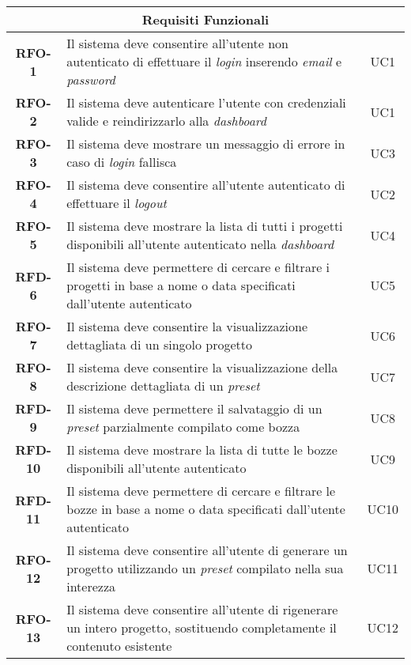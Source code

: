 \begin{longtable}{|c|>{\centering\arraybackslash}p{}|c|}
    \hline
    \multicolumn{3}{|c|}{\rowcolor{green!30} \textbf{Requisiti Funzionali}} \\
    \hline %
    \textbf{RFO-1} & Il sistema deve consentire all'utente non autenticato di effettuare il \textit{login} inserendo \textit{email} e \textit{password} & UC1 \\
    \hline
    \textbf{RFO-2} & Il sistema deve autenticare l'utente con credenziali valide e reindirizzarlo alla \textit{dashboard} & UC1 \\
    \hline
    \textbf{RFO-3} & Il sistema deve mostrare un messaggio di errore in caso di \textit{login} fallisca & UC3 \\
    \hline
    \textbf{RFO-4} & Il sistema deve consentire all'utente autenticato di effettuare il \textit{logout} & UC2 \\
    \hline
    \textbf{RFO-5} &  Il sistema deve mostrare la lista di tutti i progetti disponibili all'utente autenticato nella \textit{dashboard} & UC4 \\
    \hline
    \textbf{RFD-6} & Il sistema deve permettere di cercare e filtrare i progetti in base a nome o data specificati dall’utente autenticato & UC5 \\
    \hline
    \textbf{RFO-7} & Il sistema deve consentire la visualizzazione dettagliata di un singolo progetto & UC6 \\
    \hline
    \textbf{RFO-8} & Il sistema deve consentire la visualizzazione della descrizione dettagliata di un \textit{preset} & UC7 \\
    \hline
    \textbf{RFD-9} & Il sistema deve permettere il salvataggio di un \textit{preset} parzialmente compilato come bozza & UC8 \\
    \hline
    \textbf{RFD-10} & Il sistema deve mostrare la lista di tutte le bozze disponibili all'utente autenticato & UC9 \\
    \hline
    \textbf{RFD-11} & Il sistema deve permettere di cercare e filtrare le bozze in base a nome o data specificati dall’utente autenticato & UC10 \\
    \hline
    \textbf{RFO-12} & Il sistema deve consentire all'utente di generare un progetto utilizzando un \textit{preset} compilato nella sua interezza & UC11 \\
    \hline
    \textbf{RFO-13} & Il sistema deve consentire all'utente di rigenerare un intero progetto, sostituendo completamente il contenuto esistente & UC12 \\
    \hline

\end{longtable}
